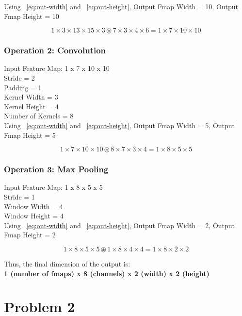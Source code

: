 \documentclass{article}
\begin{document}
Using ~\ref{eq:out-width} and ~\ref{eq:out-height}, Output Fmap Width = 10, Output Fmap Height = 10

\begin{equation}
    1 \times 3 \times 13 \times 15 \times 3 \circledast 7 \times 3 \times 4 \times 6 = 1 \times 7 \times 10 \times 10
\end{equation}

\subsubsection{Operation 2: Convolution}
Input Feature Map: 1 x 7 x 10 x 10 \\
Stride = 2 \\
Padding = 1 \\
Kernel Width = 3 \\
Kernel Height = 4 \\
Number of Kernels = 8 \\

Using ~\ref{eq:out-width} and ~\ref{eq:out-height}, Output Fmap Width = 5, Output Fmap Height = 5

\begin{equation}
    1 \times 7 \times 10 \times 10 \circledast 8 \times 7 \times 3 \times 4  = 1 \times 8 \times 5 \times 5
\end{equation}

\subsubsection{Operation 3: Max Pooling}
Input Feature Map: 1 x 8 x 5 x 5 \\
Stride = 1 \\
Window Width = 4 \\
Window Height = 4 \\

Using ~\ref{eq:out-width} and ~\ref{eq:out-height}, Output Fmap Width = 2, Output Fmap Height = 2

\begin{equation}
    1 \times 8 \times 5 \times 5 \circledast 1 \times 8 \times 4 \times 4 = 1 \times 8 \times 2 \times 2
\end{equation}

Thus, the final dimension of the output is:\\ 
\textbf{1 (number of fmaps) x 8 (channels) x 2 (width) x 2 (height)}

\section{Problem 2}
\end{document}
